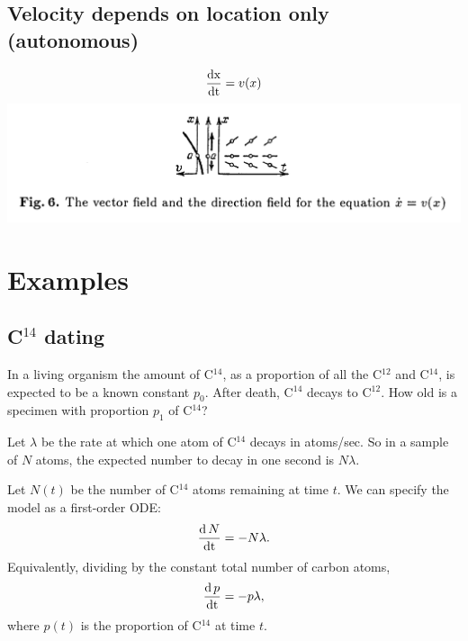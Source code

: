 \subsection{Velocity depends on location only (autonomous)}
\begin{align*}
  \frac{\operatorname{\text{dx}}}{\operatorname{\text{dt}}} = v(x)
\end{align*}
\includegraphics[width=400pt]{img/differential-equations-2-direction-field.png}\\



\section{Examples}
\subsection{C$^{14}$ dating}
\begin{mdframed}
  In a living organism the amount of C$^{14}$, as a proportion of all the
  C$^{12}$ and C$^{14}$, is expected to be a known constant $p_0$. After death,
  C$^{14}$ decays to C$^{12}$. How old is a specimen with proportion $p_1$ of
  C$^{14}$?
\end{mdframed}
Let $\lambda$ be the rate at which one atom of C$^{14}$ decays in atoms/sec. So
in a sample of $N$ atoms, the expected number to decay in one second is
$N\lambda$.

Let $N(t)$ be the number of C$^{14}$ atoms remaining at time $t$. We can
specify the model as a first-order ODE:
\begin{align*}
\frac{\operatorname{\text{d}} N}{\operatorname{\text{dt}}} = -N\lambda.
\end{align*}
Equivalently, dividing by the constant total number of carbon atoms,
\begin{align*}
\frac{\operatorname{\text{d}} p}{\operatorname{\text{dt}}} = -p\lambda,
\end{align*}
where $p(t)$ is the proportion of C$^{14}$ at time $t$.

